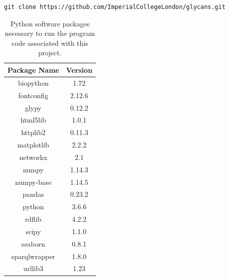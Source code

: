 \documentclass[12pt,a4paper]{article}
\begin{document}
\begin{verbatim}
git clone https://github.com/ImperialCollegeLondon/glycans.git
\end{verbatim}

\begin{table}[h]
\centering
\begin{tabular}{|c|c|} \hline
{\bf Package Name} & {\bf Version} \\ \hline
biopython   &               1.72 \\ \hline
fontconfig    &             2.12.6 \\ \hline
glypy       &               0.12.2 \\ \hline
html5lib   &                1.0.1 \\ \hline
httplib2   &                0.11.3 \\ \hline
matplotlib &                2.2.2 \\ \hline
networkx  &                 2.1 \\ \hline
numpy    &                  1.14.3 \\ \hline
numpy-base   &              1.14.5 \\ \hline
pandas  &                   0.23.2 \\ \hline
python   &                  3.6.6 \\ \hline
rdflib  &                   4.2.2 \\ \hline
scipy   &                   1.1.0 \\ \hline
seaborn  &                  0.8.1 \\ \hline
sparqlwrapper   &           1.8.0 \\ \hline
urllib3      &              1.23 \\ \hline
\end{tabular}
\caption{Python software packages necessary to run the program code associated with this project.}
\label{tab:software_dependencies}
\end{table}
\end{document}

